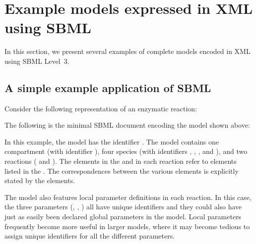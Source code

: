 
\section{Example models expressed in XML using SBML}
\label{sec:xml-rep}
\label{sec:examples}

In this section, we present several examples of complete models
encoded in XML using SBML Level~3.



\subsection{A simple example application of SBML}
\label{sec:modeleg}

Consider the following representation of an enzymatic reaction:
\begin{center}
\end{center}
The following is the minimal SBML document encoding the model shown above:


In this example, the model has the identifier
.  The model contains one compartment (with
identifier ), four species (with identifiers
, , , and ), and two reactions
( and ).  The elements in the
 and  in each
reaction refer to elements listed in the
.  The correspondences between the various
elements is explicitly stated by the 
elements.

The model also features local parameter definitions in each
reaction.  In this case, the three parameters (,
, ) all have unique identifiers and they could
also have just as easily been declared global parameters in the
model.  Local parameters frequently become more useful in larger
models, where it may become tedious to assign unique identifiers
for all the different parameters.


